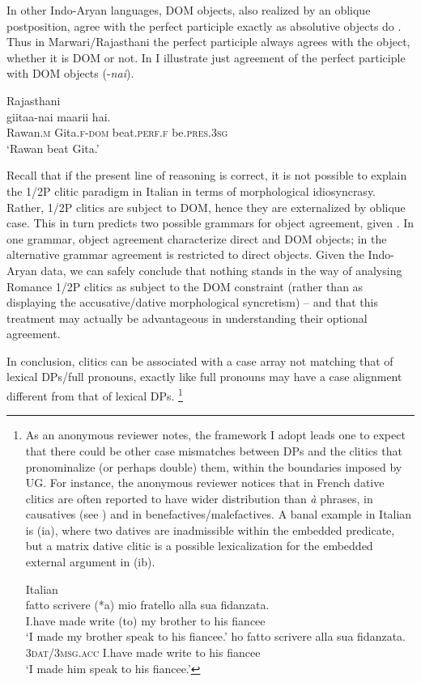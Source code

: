 \documentclass[output=paper,colorlinks,citecolor=brown,nonflat]{./langscibook}
\begin{document}
In other Indo-Aryan languages, DOM objects, also realized by an oblique postposition, agree with the perfect participle exactly as absolutive objects do \emph{\textup{\citep[342]{Masica1991}}}. Thus in Marwari/Rajasthani the perfect participle always agrees with the object, whether it is DOM or not. In  I illustrate just agreement of the perfect participle with DOM objects (-\textit{nai}).

\ea%
    \label{ex:manzini:19}
    Rajasthani \citep{Khokhlova2002}\\
       {giitaa-nai}  {maarii}    {hai}.\\
        Rawan\textsc{.m}   Gita.\textsc{f-dom}   beat.\textsc{perf.f}    be.\textsc{pres.3sg}\\
    \glt ‘Rawan beat Gita.’
\z

Recall that if the present line of reasoning is correct, it is not possible to explain the 1/2P clitic paradigm in Italian in terms of morphological idiosyncrasy. Rather, 1/2P clitics are subject to DOM, hence they are externalized by oblique case. This in turn predicts two possible grammars for object agreement, given . In one grammar, object agreement characterize direct and DOM objects; in the alternative grammar agreement is restricted to direct objects. Given the Indo-Aryan data, we can safely conclude that nothing stands in the way of analysing Romance 1/2P clitics as subject to the DOM constraint (rather than as displaying the accusative/dative morphological syncretism) – and that this treatment may actually be advantageous in understanding their optional agreement. 

In conclusion, clitics can be associated with a case array not matching that of lexical DPs/full pronouns, exactly like full pronouns may have a case alignment different from that of lexical DPs.{} \footnote{As an anonymous reviewer notes, the framework I adopt leads one to expect that there could be other case mismatches between DPs and the clitics that pronominalize (or perhaps double) them, within the boundaries imposed by UG. For instance, the anonymous reviewer notices that in French dative clitics are often reported to have wider distribution than \textit{à} phrases, in causatives (see ) and in benefactives/malefactives. A banal example in Italian is (ia), where two datives are inadmissible within the embedded predicate, but a matrix dative clitic is a possible lexicalization for the embedded external argument in (ib). 

\ea%
    
    Italian\\
    \ea {} {fatto} {scrivere} (*a) {mio} {fratello} {alla} {sua} {fidanzata}.\\
        {I.have} made write (to) my brother to his fiancee\\
    \glt `I made my brother speak to his fiancee.'
    \ex {} {ho} {fatto} {scrivere}   {alla} {sua} {fidanzata}.\\
        {3\textsc{dat}/\textsc{3msg.acc}} {I.have} made write   to his fiancee\\
    \glt ‘I made him speak to his fiancee.’
    \z
\z
}
\end{document}
